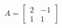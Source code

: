 \documentclass[preview]{standalone}
\begin{document}
\begin{align*}
A = \begin{bmatrix} 2 & -1 \\ 1 & 1 \end{bmatrix}
\end{align*}
\end{document}
